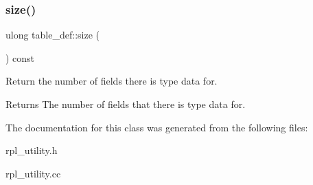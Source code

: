 \subsubsection{\texorpdfstring{size()}{size()}}
{\footnotesize\ttfamily ulong table\+\_\+def\+::size (\begin{DoxyParamCaption}{ }\end{DoxyParamCaption}) const\hspace{0.3cm}{\ttfamily [inline]}}

Return the number of fields there is type data for.

\begin{DoxyReturn}{Returns}
The number of fields that there is type data for. 
\end{DoxyReturn}


The documentation for this class was generated from the following files\+:\begin{DoxyCompactItemize}
\item 
rpl\+\_\+utility.\+h\item 
rpl\+\_\+utility.\+cc\end{DoxyCompactItemize}
